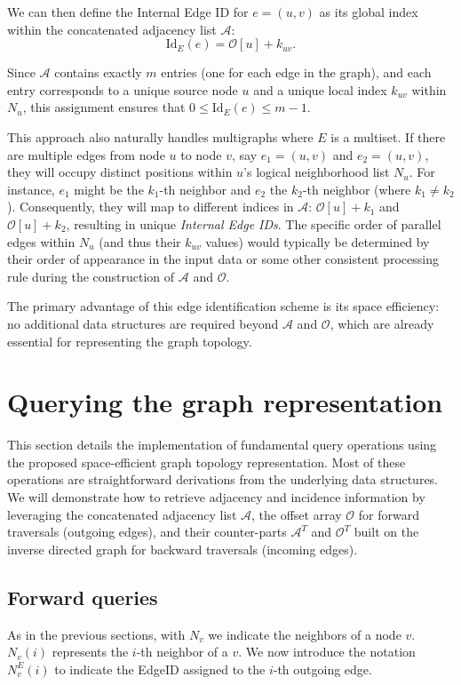 We can then define the Internal Edge ID for $e=(u,v)$ as its global index within the concatenated adjacency list $\mathcal{A}$:
\[
\mathrm {Id}_E(e) = \mathcal{O}[u] + k_{uv}.
\]

Since $\mathcal{A}$ contains exactly $m$ entries (one for each edge in the graph), and each entry corresponds to a unique source node $u$ and a unique local index $k_{uv}$ within $N_u$, this assignment ensures that $0 \le \mathrm{Id}_E(e) \le m-1$.

This approach also naturally handles multigraphs where $E$ is a multiset. If there are multiple edges from node $u$ to node $v$, say $e_1 = (u,v)$ and $e_2 = (u,v)$, they will occupy distinct positions within $u$'s logical neighborhood list $N_u$. For instance, $e_1$ might be the $k_1$-th neighbor and $e_2$ the $k_2$-th neighbor (where $k_1 \neq k_2$). Consequently, they will map to different indices in $\mathcal{A}$: $\mathcal{O}[u] + k_1$ and $\mathcal{O}[u] + k_2$, resulting in unique \emph{Internal Edge IDs}. The specific order of parallel edges within $N_u$ (and thus their $k_{uv}$ values) would typically be determined by their order of appearance in the input data or some other consistent processing rule during the construction of $\mathcal{A}$ and $\mathcal{O}$.

The primary advantage of this edge identification scheme is its space efficiency: no additional data structures are required beyond $\mathcal{A}$ and $\mathcal{O}$, which are already essential for representing the graph topology.

\label{sec:querying_representation} 
\section{Querying the graph representation}

This section details the implementation of fundamental query operations using the proposed space-efficient graph topology representation. Most of these operations are straightforward derivations from the underlying data structures. We will demonstrate how to retrieve adjacency and incidence information by leveraging the concatenated adjacency list $\mathcal{A}$, the offset array $\mathcal{O}$ for forward traversals (outgoing edges), and their counter-parts $\mathcal A^{T}$ and $\mathcal O^{T}$ built on the inverse directed graph for backward traversals (incoming edges).

\subsection{Forward queries}
\label{ssec:forward_queries}
 As in the previous sections, with $N_v$ we indicate the neighbors of a node $v$. $N_v(i)$ represents the $i$-th neighbor of a $v$. We now introduce the notation $N_v^E(i)$ to indicate the EdgeID assigned to the $i$-th outgoing edge.


